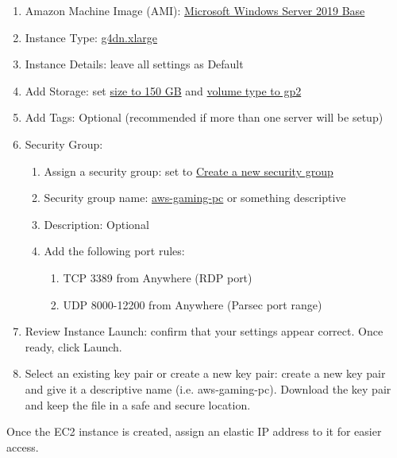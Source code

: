 \documentclass[titlepage, 12pt]{article}
\begin{document}
	\begin{enumerate}
	\item{Amazon Machine Image (AMI): \underline{Microsoft Windows Server 2019 Base}}
	\item{Instance Type: \underline{g4dn.xlarge}}
	\item{Instance Details: leave all settings as Default}
	\item{Add Storage: set \underline{size to 150 GB} and \underline{volume type to gp2}}
	\item{Add Tags: Optional (recommended if more than one server will be setup)}
	\item{Security Group:}
		\begin{enumerate}
		\item{Assign a security group: set to \underline{Create a new security group}}
		\item{Security group name: \underline{aws-gaming-pc} or something descriptive}
		\item{Description: Optional}
		\item{Add the following port rules:}
			\begin{enumerate}
			\item{TCP 3389 from Anywhere (RDP port)}
			\item{UDP 8000-12200 from Anywhere (Parsec port range)}
			\end{enumerate}
		\end{enumerate}
	\item{Review Instance Launch: confirm that your settings appear correct. Once ready, click Launch.}
	\item{Select an existing key pair or create a new key pair: create a new key pair and give it a descriptive name (i.e. aws-gaming-pc). Download the key pair and keep the file in a safe and secure location.}
	\end{enumerate}

	Once the EC2 instance is created, assign an elastic IP address to it for easier access.
\end{document}
